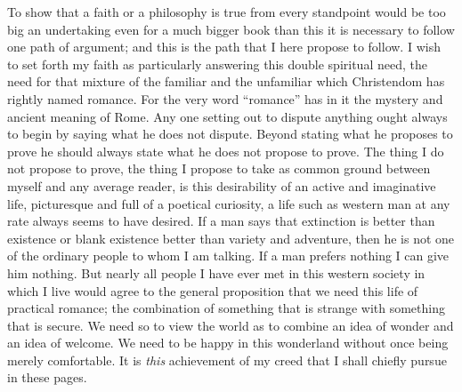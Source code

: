 \documentclass{book}
\begin{document}
To show that a faith or a philosophy is true from every standpoint would be too big an undertaking even for a much bigger book than this it is necessary to follow one path of argument; and this is the path that I here propose to follow. I wish to set forth my faith as particularly answering this double spiritual need, the need for that mixture of the familiar and the unfamiliar which Christendom has rightly named romance. For the very word “romance” has in it the mystery and ancient meaning of Rome. Any one setting out to dispute anything ought always to begin by saying what he does not dispute. Beyond stating what he proposes to prove he should always state what he does not propose to prove. The thing I do not propose to prove, the thing I propose to take as common ground between myself and any average reader, is this desirability of an active and imaginative life, picturesque and full of a poetical curiosity, a life such as western man at any rate always seems to have desired. If a man says that extinction is better than existence or blank existence better than variety and adventure, then he is not one of the ordinary people to whom I am talking. If a man prefers nothing I can give him nothing. But nearly all people I have ever met in this western society in which I live would agree to the general proposition that we need this life of practical romance; the combination of something that is strange with something that is secure. We need so to view the world as to combine an idea of wonder and an idea of welcome. We need to be happy in this wonderland without once being merely comfortable. It is \emph{this} achievement of my creed that I shall chiefly pursue in these pages.
\end{document}
